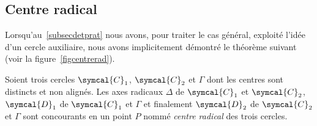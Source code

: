  \subsection{Centre radical}
 Lorsqu'au~\ref{subsecdetprat} nous avons, pour traiter le cas général, exploité l'idée d'un cercle auxiliaire, nous avons implicitement démontré le théorème suivant (voir la figure~\ref{figcentrerad}).
 \begin{thm}
 Soient trois cercles $\symcal{C}_1$, $\symcal{C}_2$ et $\Gamma$ dont les centres sont distincts et non alignés. Les axes radicaux $\Delta$ de $\symcal{C}_1$ et $\symcal{C}_2$, $\symcal{D}_1$ de $\symcal{C}_1$ et $\Gamma$ et finalement $\symcal{D}_2$ de $\symcal{C}_2$ et $\Gamma$ sont concourants en un point $P$ nommé \emph{centre radical} des trois cercles.
 \end{thm}
 
\newcommand{\figurecentrerad}{%
 \begin{figure}[ht]
\centering
\begin{tikzpicture}
\coordinate (O1) at (0.4,0);
\coordinate(X1) at (1.5,0);
\node[draw,label=above:$\symcal{C_1}$] (c1) at (O1) [circle through={(X1)}]{};
\coordinate (O2) at (3.6,0);
\coordinate(X2) at (5,0);
\node[draw,label=above:$\symcal{C_2}$] (c2) at (O2) [circle through={(X2)}]{};
\coordinate(Y) at (2,-1);
\coordinate(U) at (2,0.5);
\node[draw,label=below:$\kern10pt\Gamma$] (g) at (Y) [circle through={(U)}]{};
\coordinate(A1) at  (intersection 2 of c1 and g);
\coordinate(B1) at  (intersection 1 of c1 and g);
\coordinate(A2) at  (intersection 1 of c2 and g);
\coordinate(B2) at  (intersection 2 of c2 and g);
\coordinate[label=right:$\symcal{D}_1$](Y1) at ($(A1)!1.8!(B1)$);
\coordinate[label=left:$\symcal{D}_2$](Y2) at ($(A2)!1.5!(B2)$);
\coordinate[label=left:$P$](P) at (intersection of A1--B1 and A2--B2);
\draw (P)--(Y1);
\draw (P)--(Y2);
\coordinate(W1) at ($(O1)!0.5!(P)$);
\coordinate(W2) at ($(O2)!0.5!(P)$);
\node (w1) at (W1) [circle through={(P)}]{};
\node(w2) at (W2) [circle through={(P)}]{};
\coordinate(H) at  (intersection 1 of w1 and w2);
\coordinate[label=left:$\Delta$](V1) at ($(H)!1.5!(P)$);
\coordinate(V2) at ($(H)!-2.4!(P)$);
\draw(V1)--(V2);
\foreach \point in {P,A1,B1,A2,B2}
\draw[black,fill=white](\point) circle (1.2pt);	
\end{tikzpicture}
\figcaption{}\label{figcentrerad}
\end{figure}
}


